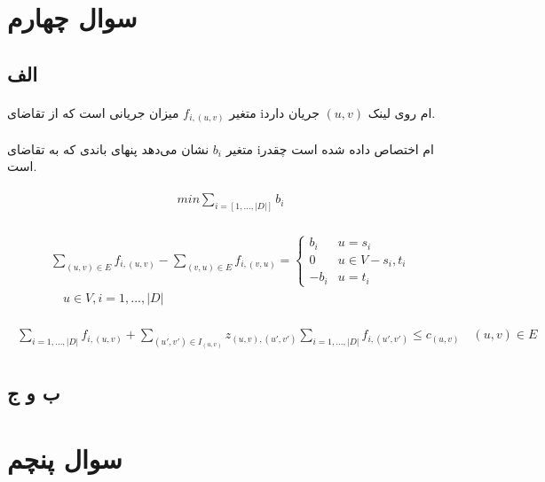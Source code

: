 \documentclass[paper=a4, fontsize=11pt]{article}
\numberwithin{equation}{section} %
\numberwithin{figure}{section} %
\numberwithin{table}{section} %
\begin{document}
\section{سوال چهارم}
\subsection{الف}
\paragraph{}
متغیر $f_{i,(u,v)}$ میزان جریانی است که از تقاضای iام روی لینک
$(u,v)$ جریان دارد.

\paragraph{}
متغیر $b_i$ نشان می‌دهد پنهای باندی که به تقاضای iام
اختصاص داده شده است چقدر است.

\begin{align}
\begin{split}
	min \sum_{i = [1, ..., |D|]} b_i
\end{split}
\end{align}

\begin{align}
\begin{split}
	\sum_{(u,v) \in E} f_{i,(u,v)} - \sum_{(v,u) \in E} f_{i,(v,u)} = 
	\left \{
		\begin{array}{cc}
			b_i & u = s_i\\
			0 & u \in V - {s_i, t_i}\\
			-b_i & u = t_i
		\end{array}
	\right.
	\\
	\quad u \in V, i = {1, ..., |D|}
\end{split}
\end{align}

\begin{align}
\begin{split}
	\sum_{i = {1, ..., |D|}} f_{i,(u,v)} + \sum_{(u',v') \in I_{(u,v)}} z_{(u,v),(u',v')} \sum_{i = {1, ..., |D|}} f_{i,(u',v')} \le c_{(u,v)}
	\quad (u,v) \in E
\end{split}
\end{align}

\subsection{ب و ج}


\section{سوال پنچم}
\end{document}

